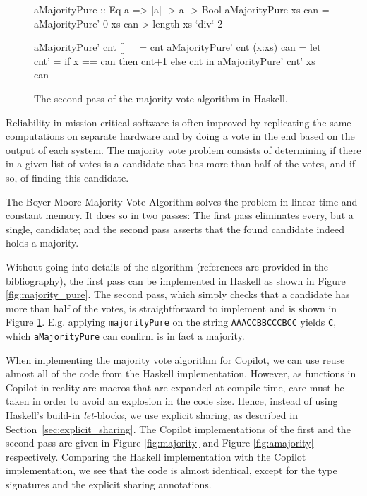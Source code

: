 \documentclass[]{article}
\theoremstyle{example}
\begin{document}
\begin{figure}
\begin{code}
aMajorityPure :: Eq a => [a] -> a -> Bool
aMajorityPure xs can = aMajorityPure' 0 xs can > length xs `div` 2

aMajorityPure' cnt []     _   = cnt
aMajorityPure' cnt (x:xs) can =
  let
    cnt' = if x == can then cnt+1 else cnt
  in
    aMajorityPure' cnt' xs can
\end{code}
\caption{The second pass of the majority vote algorithm in Haskell.}
\label{fig:amajority_pure}
\end{figure}

Reliability in mission critical software is often improved by replicating
the same computations on separate hardware and by doing a vote in the end
based on the output of each system. The majority vote problem consists of
determining if there in a given list of votes is a candidate that has more
than half of the votes, and if so, of finding this candidate.

The Boyer-Moore Majority Vote Algorithm \cite{MooreBoyer82, Hesselink2005}
solves the problem in linear time and constant memory. It does so in two passes:
The first pass eliminates every, but a single, candidate; and the second pass
asserts that the found candidate indeed holds a majority.

Without going into details of the algorithm (references are provided in the
bibliography), the first pass can be implemented in Haskell as shown in Figure
\ref{fig:majority_pure}. The second pass, which simply checks that a candidate
has more than half of the votes, is straightforward to implement and is shown
in Figure \ref{fig:amajority_pure}.
E.g. applying {\tt majorityPure} on the string {\tt AAACCBBCCCBCC} yields
{\tt C}, which {\tt aMajorityPure} can confirm is in fact a majority.

When implementing the majority vote algorithm for Copilot, we can use reuse
almost all of the code from the Haskell implementation. However, as functions
in Copilot in reality are macros that are expanded at compile time, care must
be taken in order to avoid an explosion in the code size. Hence, instead of
using Haskell's build-in \emph{let}-blocks, we use explicit sharing, as
described in Section~\ref{sec:explicit_sharing}. The Copilot implementations
of the first and the second pass are given in Figure \ref{fig:majority} and
Figure \ref{fig:amajority} respectively. Comparing the Haskell implementation
with the Copilot implementation, we see that the code is almost identical,
except for the type signatures and the explicit sharing annotations.
\end{document}
